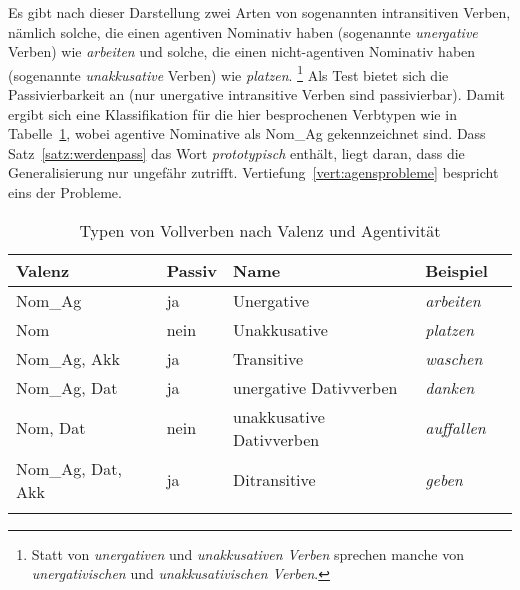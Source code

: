 
Es gibt nach dieser Darstellung zwei Arten von sogenannten intransitiven Verben, nämlich solche, die einen agentiven Nominativ haben (sogenannte \textit{unergative} Verben) wie \textit{arbeiten} und solche, die einen nicht-agentiven Nominativ haben (sogenannte \textit{unakkusative} Verben) wie \textit{platzen}.%
\footnote{Statt von \textit{unergativen} und \textit{unakkusativen Verben} sprechen manche von \textit{unergativischen} und \textit{unakkusativischen Verben}.}
Als Test bietet sich die Passivierbarkeit an (nur unergative intransitive Verben sind passivierbar).
Damit ergibt sich eine Klassifikation für die hier besprochenen Verbtypen wie in Tabelle~\ref{tab:vtypen}, wobei agentive Nominative als Nom\_Ag gekennzeichnet sind.
Dass Satz~\ref{satz:werdenpass} das Wort \textit{prototypisch} enthält, liegt daran, dass die Generalisierung nur ungefähr zutrifft.
Vertiefung~\ref{vert:agensprobleme} bespricht eins der Probleme.

\begin{table}[!htbp]
    \begin{tabular}{lllll}
      \lsptoprule
      \textbf{Valenz} & \textbf{Passiv} & \textbf{Name} & \textbf{Beispiel} \\
      \midrule
      Nom\_Ag & ja & Unergative & \textit{arbeiten} \\
      Nom & nein & Unakkusative & \textit{platzen} \\
      Nom\_Ag, Akk & ja & Transitive & \textit{waschen} \\
      Nom\_Ag, Dat & ja & unergative Dativverben & \textit{danken} \\
      Nom, Dat & nein & unakkusative Dativverben & \textit{auffallen} \\
      Nom\_Ag, Dat, Akk & ja & Ditransitive & \textit{geben} \\
      \lspbottomrule
    \end{tabular}
  \caption{Typen von Vollverben nach Valenz und Agentivität}
  \label{tab:vtypen}
\end{table}

